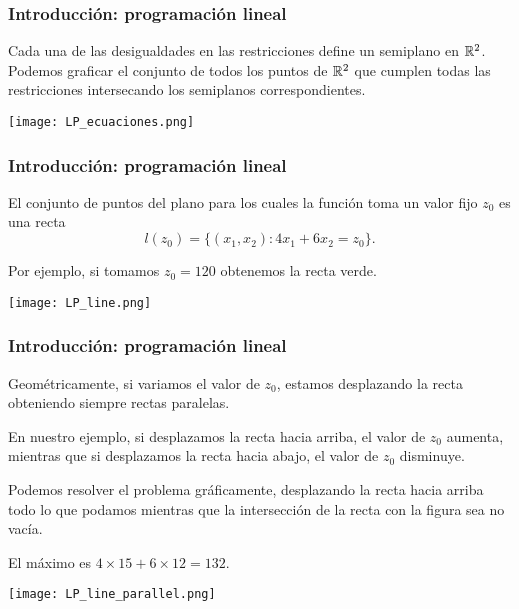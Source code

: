 \documentclass[aspectratio=169,12pt,spanish]{beamer}
\begin{document}

\begin{frame}
\frametitle{Introducción: programación lineal}

Cada una de las desigualdades en las restricciones define un semiplano en $\mathbb{R}^2$.
Podemos graficar el conjunto de todos los puntos de $\mathbb{R}^2$ que cumplen todas las restricciones intersecando los semiplanos correspondientes.

\begin{center}
\texttt{[image: LP\_ecuaciones.png]}
\end{center}

\end{frame}


\begin{frame}
\frametitle{Introducción: programación lineal}

El conjunto de puntos del plano para los cuales la función toma un valor fijo $z_0$ es una recta
$$
l(z_0) = \{(x_1, x_2) : 4x_1 + 6x_2 = z_0\}.
$$

Por ejemplo, si tomamos $z_0 = 120$ obtenemos la recta verde.

\begin{center}
\texttt{[image: LP\_line.png]}
\end{center}

\end{frame}


\begin{frame}
\frametitle{Introducción: programación lineal}

Geométricamente, si variamos el valor de $z_0$, estamos desplazando la recta obteniendo siempre rectas paralelas.

En nuestro ejemplo, si desplazamos la recta hacia arriba, el valor de $z_0$ aumenta, mientras que si desplazamos la recta hacia abajo, el valor de $z_0$ disminuye.

\begin{minipage}{0.6\textwidth}
Podemos resolver el problema gráficamente, desplazando la recta hacia arriba todo lo que podamos mientras que la intersección de la recta con la figura sea no vacía.

El máximo es $4 \times 15 + 6 \times 12 = 132$.
\end{minipage}
\begin{minipage}{0.35\textwidth}
\begin{center}
\texttt{[image: LP\_line\_parallel.png]}
\end{center}
\end{minipage}



\end{frame}
\end{document}
